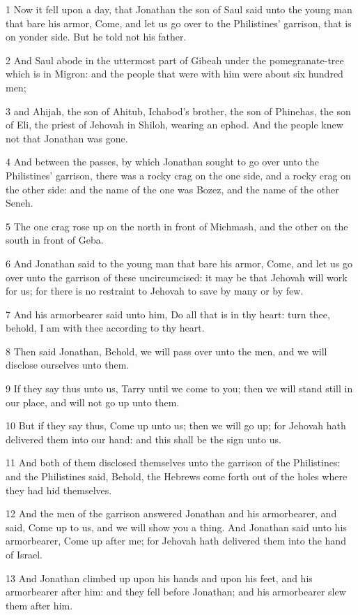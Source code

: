 \par 1 Now it fell upon a day, that Jonathan the son of Saul said unto the young man that bare his armor, Come, and let us go over to the Philistines' garrison, that is on yonder side. But he told not his father.
\par 2 And Saul abode in the uttermost part of Gibeah under the pomegranate-tree which is in Migron: and the people that were with him were about six hundred men;
\par 3 and Ahijah, the son of Ahitub, Ichabod's brother, the son of Phinehas, the son of Eli, the priest of Jehovah in Shiloh, wearing an ephod. And the people knew not that Jonathan was gone.
\par 4 And between the passes, by which Jonathan sought to go over unto the Philistines' garrison, there was a rocky crag on the one side, and a rocky crag on the other side: and the name of the one was Bozez, and the name of the other Seneh.
\par 5 The one crag rose up on the north in front of Michmash, and the other on the south in front of Geba.
\par 6 And Jonathan said to the young man that bare his armor, Come, and let us go over unto the garrison of these uncircumcised: it may be that Jehovah will work for us; for there is no restraint to Jehovah to save by many or by few.
\par 7 And his armorbearer said unto him, Do all that is in thy heart: turn thee, behold, I am with thee according to thy heart.
\par 8 Then said Jonathan, Behold, we will pass over unto the men, and we will disclose ourselves unto them.
\par 9 If they say thus unto us, Tarry until we come to you; then we will stand still in our place, and will not go up unto them.
\par 10 But if they say thus, Come up unto us; then we will go up; for Jehovah hath delivered them into our hand: and this shall be the sign unto us.
\par 11 And both of them disclosed themselves unto the garrison of the Philistines: and the Philistines said, Behold, the Hebrews come forth out of the holes where they had hid themselves.
\par 12 And the men of the garrison answered Jonathan and his armorbearer, and said, Come up to us, and we will show you a thing. And Jonathan said unto his armorbearer, Come up after me; for Jehovah hath delivered them into the hand of Israel.
\par 13 And Jonathan climbed up upon his hands and upon his feet, and his armorbearer after him: and they fell before Jonathan; and his armorbearer slew them after him.

